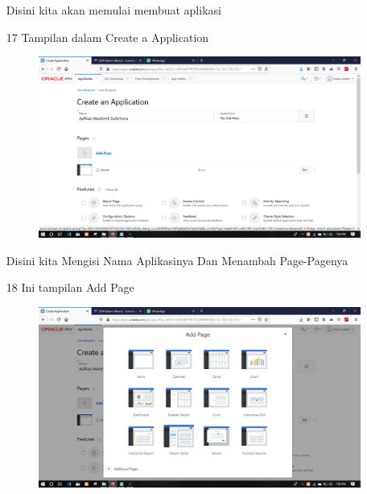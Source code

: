 \begin{enumerate}
\par
Disini kita akan memulai membuat aplikasi

\newpage
\item[17]Tampilan dalam Create a Application

\begin{figure}[!htbp]
    \begin{center}
    \includegraphics[scale=0.2]{figures/21.png}
    \end{center}   
    \end{figure}
    
\par
Disini kita Mengisi Nama Aplikasinya Dan Menambah Page-Pagenya

\item[18]Ini tampilan Add Page

\begin{figure}[!htbp]
    \begin{center}
    \includegraphics[scale=0.2]{figures/22.png}
    \end{center}   
    \end{figure}
    

\end{enumerate}
